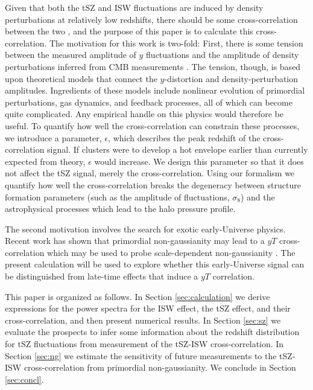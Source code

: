 \documentclass[aps,twocolumn,floats,prd,nofootinbib,10pt,floatfix]{revtex4-1}
\begin{document}
Given that both the tSZ and ISW fluctuations are induced by
density perturbations at relatively low redshifts, there should
be some cross-correlation between the two \cite{Taburet:2010hb},
and the purpose of
this paper is to calculate this cross-correlation.  The
motivation for this work is two-fold:  First, there is some
tension between the measured amplitude of $y$ fluctuations and
the amplitude of density perturbations inferred from CMB
measurements
\cite{Lueker:2009rx,Komatsu:2010fb,Ade:2013lmv,Ade:2015fva}.
The tension, though, is based
upon theoretical models that connect the $y$-distortion and
density-perturbation amplitudes.  Ingredients of these models
include nonlinear evolution of primordial perturbations, gas
dynamics, and feedback processes, all of which can become quite
complicated.  Any empirical handle on this physics would
therefore be useful. To quantify how well the cross-correlation
can constrain these processes, we introduce a parameter, 
$\epsilon$, which describes the peak redshift of the cross-correlation 
signal. If clusters were to develop a hot envelope earlier than currently 
expected from theory, $\epsilon$ would increase. We design this 
parameter so that it does not affect the tSZ signal, merely the 
cross-correlation. Using our formalism we quantify
how well the cross-correlation breaks the degeneracy between 
structure formation parameters (such as the amplitude of 
fluctuations, $\sigma_8$) and the astrophysical processes which
lead to the halo pressure profile.

The second motivation involves the search for exotic
early-Universe physics.  Recent work has shown that primordial
non-gaussianity may lead to a $yT$ cross-correlation
which may be used to probe scale-dependent non-gaussianity
\cite{Emami:2015xqa}.  The present calculation will be used to
explore whether this early-Universe signal can be distinguished
from late-time effects that induce a $yT$ correlation.

This paper is organized as follows.  In Section
\ref{sec:calculation} we derive expressions for the power
spectra for the ISW effect, the tSZ effect, and their
cross-correlation, and then present numerical results.  In
Section \ref{sec:sz} we evaluate the prospects to infer some
information about the redshift distribution for tSZ fluctuations
from measurement of the tSZ-ISW cross-correlation.  In
Section \ref{sec:ng} we estimate the sensitivity of future
measurements to the tSZ-ISW cross-correlation from primordial
non-gaussianity.  We conclude in Section \ref{sec:concl}.
\end{document}
